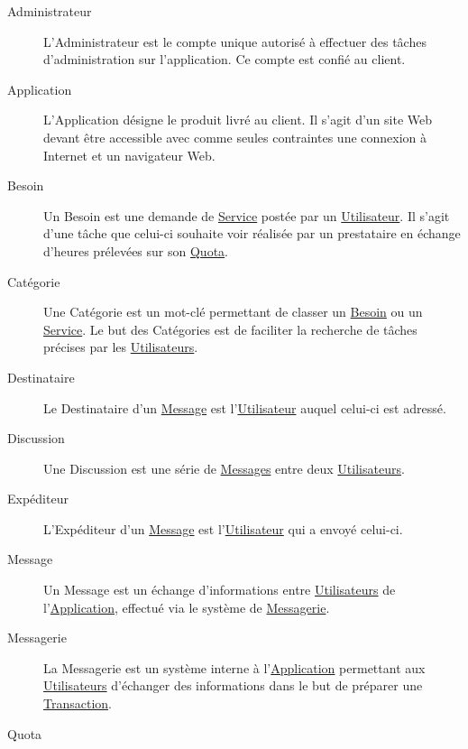 \documentclass[french,12pt]{article}
\begin{document}
		\begin{description}
			\item[\hypertarget{administrateur}{Administrateur}] 
				L’Administrateur est le compte unique autorisé à effectuer des tâches
				 d’administration sur l’application. Ce compte est confié au client.
			\item[\hypertarget{application}{Application}]
				L’Application désigne le produit livré au client. Il s’agit d’un site
				 Web devant être accessible avec comme seules contraintes une connexion
				 à Internet et un navigateur Web.
			\item[\hypertarget{besoin}{Besoin}]
				Un Besoin est une demande de \hyperlink{service}{Service} postée par un
				 \hyperlink{utilisateur}{Utilisateur}. Il s’agit d’une tâche que
				 celui-ci souhaite voir réalisée par un prestataire en échange d’heures
				 prélevées sur son \hyperlink{quota}{Quota}.
			\item[\hypertarget{categorie}{Catégorie}]
				Une Catégorie est un mot-clé permettant de classer un
				 \hyperlink{besoin}{Besoin} ou un \hyperlink{service}{Service}. Le but
				 des Catégories est de faciliter la recherche de tâches précises par les
				 \hyperlink{utilisateur}{Utilisateurs}.
			\item[\hypertarget{destinataire}{Destinataire}]
				Le Destinataire d’un \hyperlink{message}{Message} est
				 l’\hyperlink{utilisateur}{Utilisateur} auquel celui-ci est adressé.
			\item[\hypertarget{discussion}{Discussion}]
				Une Discussion est une série de \hyperlink{message}{Messages} entre deux
				 \hyperlink{utilisateur}{Utilisateurs}.
			\item[\hypertarget{expediteur}{Expéditeur}]
				L’Expéditeur d’un \hyperlink{message}{Message} est
				 l’\hyperlink{utilisateur}{Utilisateur} qui a envoyé celui-ci.
			\item[\hypertarget{message}{Message}]
				Un Message est un échange d’informations entre
				 \hyperlink{utilisateur}{Utilisateurs} de
				 l’\hyperlink{application}{Application}, effectué via le système de
				 \hyperlink{messagerie}{Messagerie}.
			\item[\hypertarget{messagerie}{Messagerie}]
				La Messagerie est un système interne à
				 l’\hyperlink{application}{Application} permettant aux
				 \hyperlink{utilisateur}{Utilisateurs} d’échanger des informations dans
				 le but de préparer une \hyperlink{transaction}{Transaction}.
			\item[\hypertarget{quota}{Quota}]

\end{description}
\end{document}
